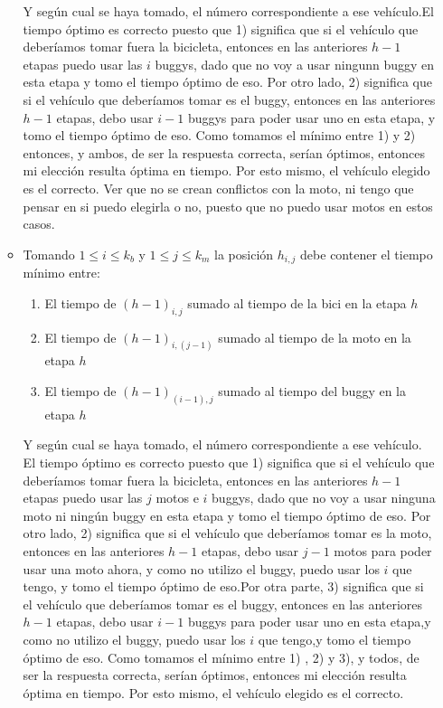 \begin{itemize}
\begin{itemize}
		Y según cual se haya tomado, el número correspondiente a ese vehículo.El tiempo óptimo es correcto puesto que 1) significa que si el vehículo que deberíamos tomar fuera la bicicleta, entonces en las anteriores $h-1$ etapas puedo usar las $i$ buggys, dado que no voy a usar ningunn buggy en esta etapa y tomo el tiempo óptimo de eso. Por otro lado, 2) significa que si el vehículo que deberíamos tomar es el buggy, entonces en las anteriores $h-1$ etapas, debo usar $i-1$ buggys para poder usar uno en esta etapa, y tomo el tiempo óptimo de eso. Como tomamos el mínimo entre 1) y 2) entonces, y ambos, de ser la respuesta correcta, serían óptimos, entonces mi elección resulta óptima en tiempo. Por esto mismo, el vehículo elegido es el correcto. Ver que no se crean conflictos con la moto, ni tengo que pensar en si puedo elegirla o no, puesto que no puedo usar motos en estos casos.
		\item Tomando $1\leq i \leq k_{b}$ y $1\leq j \leq k_{m}$ la posición $h_{i,j}$ debe contener el tiempo mínimo entre:
		\begin{enumerate}
			\item El tiempo de $(h-1)_{i,j}$ sumado al tiempo de la bici en la etapa $h$
			\item El tiempo de $(h-1)_{i,(j-1)}$ sumado al tiempo de la moto en la etapa $h$
			\item El tiempo de $(h-1)_{(i-1),j}$ sumado al tiempo del buggy en la etapa $h$
		\end{enumerate} 
		Y según cual se haya tomado, el número correspondiente a ese vehículo. El tiempo óptimo es correcto puesto que 1) significa que si el vehículo que deberíamos tomar fuera la bicicleta, entonces en las anteriores $h-1$ etapas puedo usar las $j$ motos e $i$ buggys, dado que no voy a usar ninguna moto ni ningún buggy en esta etapa y tomo el tiempo óptimo de eso. Por otro lado, 2) significa que si el vehículo que deberíamos tomar es la moto, entonces en las anteriores $h-1$ etapas, debo usar $j-1$ motos para poder usar una moto ahora, y como no utilizo el buggy, puedo usar los $i$ que tengo, y tomo el tiempo óptimo de eso.Por otra parte, 3) significa que si el vehículo que deberíamos tomar es el buggy, entonces en las anteriores $h-1$ etapas, debo usar $i-1$ buggys para poder usar uno en esta etapa,y como no utilizo el buggy, puedo usar los $i$ que tengo,y tomo el tiempo óptimo de eso. Como tomamos el mínimo entre 1) , 2) y 3), y todos, de ser la respuesta correcta, serían óptimos, entonces mi elección resulta óptima en tiempo. Por esto mismo, el vehículo elegido es el correcto.

	\end{itemize}

\end{itemize}
